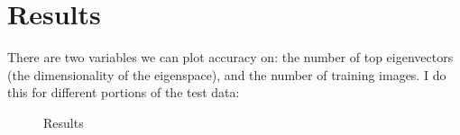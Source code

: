 \documentclass[11pt]{report}
\begin{document}
\section{Results}


There are two variables we can plot accuracy on: the number of top eigenvectors (the dimensionality of the eigenspace), and the number of training images. I do this for different portions of the test data:

\begin{figure}[H]
  \centering
  \hfil

  \caption{Results}
  \label{fig:results}
\end{figure}
\end{document}
